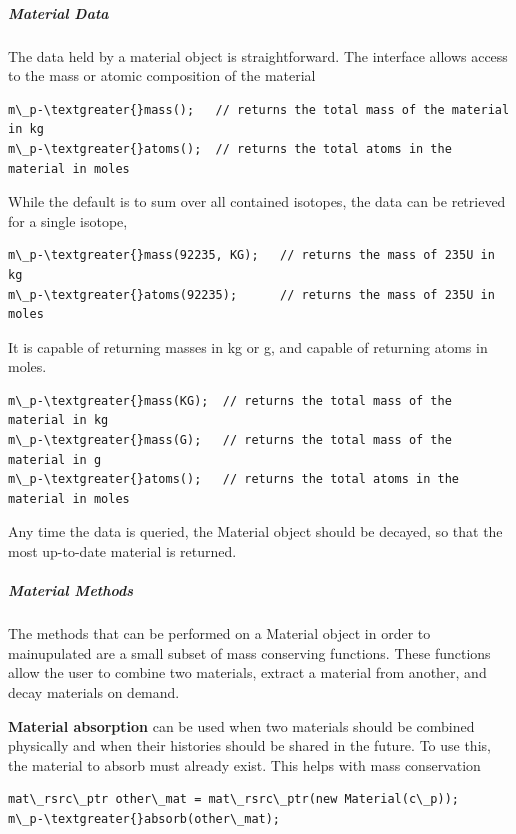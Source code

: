 \documentclass[letterpaper,10pt,english]{sphinxmanual}
\begin{document}
\subparagraph{Material Data}
\label{devdoc/materials_and_isotopes:material-data}
The data held by a material object is straightforward. The interface allows
access to the mass or atomic composition of the material

\begin{Verbatim}[commandchars=\\\{\}]
m\_p-\textgreater{}mass();   // returns the total mass of the material in kg
m\_p-\textgreater{}atoms();  // returns the total atoms in the material in moles
\end{Verbatim}

While the default is to sum over all contained isotopes, the data can be
retrieved for a single isotope,

\begin{Verbatim}[commandchars=\\\{\}]
m\_p-\textgreater{}mass(92235, KG);   // returns the mass of 235U in kg
m\_p-\textgreater{}atoms(92235);      // returns the mass of 235U in moles
\end{Verbatim}

It is capable of returning masses in kg or g, and capable of returning atoms in moles.

\begin{Verbatim}[commandchars=\\\{\}]
m\_p-\textgreater{}mass(KG);  // returns the total mass of the material in kg
m\_p-\textgreater{}mass(G);   // returns the total mass of the material in g
m\_p-\textgreater{}atoms();   // returns the total atoms in the material in moles
\end{Verbatim}

Any time the data is queried, the Material object should be decayed, so that the
most up-to-date material is returned.


\subparagraph{Material Methods}
\label{devdoc/materials_and_isotopes:material-methods}
The methods that can be performed on a Material object in order to mainupulated
are a small subset of mass conserving functions. These functions allow the user
to combine two materials, extract a material from another, and decay materials
on demand.

\textbf{Material absorption} can be used when two materials should be combined physically
and when their histories should be shared in the future. To use this, the material
to absorb must already exist. This helps with mass conservation

\begin{Verbatim}[commandchars=\\\{\}]
mat\_rsrc\_ptr other\_mat = mat\_rsrc\_ptr(new Material(c\_p));
m\_p-\textgreater{}absorb(other\_mat);
\end{Verbatim}
\end{document}
